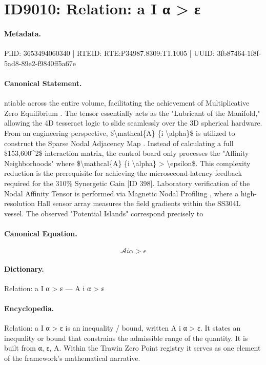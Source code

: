 \section*{ID9010: Relation: a I α > ε}
\paragraph{Metadata.}
PiID: 3653494060340 | RTEID: RTE:P34987.8309:T1.1005 | UUID: 3fb87464-1f8f-5ad8-89e2-f9840ff5a67e

\paragraph{Canonical Statement.}
ntiable across the entire volume, facilitating the achievement of Multiplicative Zero Equilibrium . The tensor essentially acts as the "Lubricant of the Manifold," allowing the 4D tesseract logic to slide seamlessly over the 3D spherical hardware. From an engineering perspective, \$\textbackslash{}mathcal\{A\} \{i \textbackslash{}alpha\}\$ is utilized to construct the Sparse Nodal Adjacency Map . Instead of calculating a full \$153,600\textasciicircum{}2\$ interaction matrix, the control board only processes the "Affinity Neighborhoods" where \$\textbackslash{}mathcal\{A\} \{i \textbackslash{}alpha\} > \textbackslash{}epsilon\$. This complexity reduction is the prerequisite for achieving the microsecond-latency feedback required for the 310\% Synergetic Gain [ID 398]. Laboratory verification of the Nodal Affinity Tensor is performed via Magnetic Nodal Profiling , where a high-resolution Hall sensor array measures the field gradients within the SS304L vessel. The observed "Potential Islands" correspond precisely to

\paragraph{Canonical Equation.}
\[
\mathcal{A} {i \alpha} > \epsilon
\]

\paragraph{Dictionary.}
Relation: a I α > ε — A i α > ε

\paragraph{Encyclopedia.}
Relation: a I α > ε is an inequality / bound, written A i α > ε. It states an inequality or bound that constrains the admissible range of the quantity. It is built from α, ε, A. Within the Trawin Zero Point registry it serves as one element of the framework's mathematical narrative.
